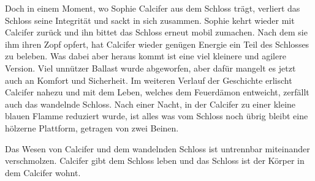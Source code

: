 Doch in einem Moment, wo Sophie Calcifer aus dem Schloss trägt, verliert das Schloss seine Integrität und sackt in sich zusammen. Sophie kehrt wieder mit Calcifer zurück und ihn bittet das Schloss erneut mobil zumachen. Nach dem sie ihm ihren Zopf opfert, hat Calcifer wieder genügen Energie ein Teil des Schlosses zu beleben. Was dabei aber heraus kommt ist eine viel kleinere und agilere Version. Viel unnützer Ballast wurde abgeworfen, aber dafür mangelt es jetzt auch an Komfort und Sicherheit. Im weiteren Verlauf der Geschichte erlischt Calcifer nahezu und mit dem Leben, welches dem Feuerdämon entweicht, zerfällt auch das wandelnde Schloss. Nach einer Nacht, in der Calcifer zu einer kleine blauen Flamme reduziert wurde, ist alles was vom Schloss noch übrig bleibt eine hölzerne Plattform, getragen von zwei Beinen. 

Das Wesen von Calcifer und dem wandelnden Schloss ist untrennbar miteinander verschmolzen. Calcifer gibt dem Schloss leben und das Schloss ist der Körper in dem Calcifer wohnt. 
